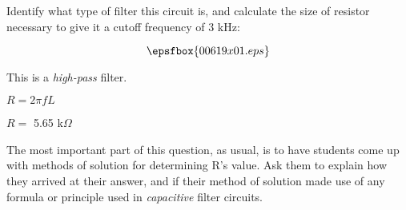 

Identify what type of filter this circuit is, and calculate the size of resistor necessary to give it a cutoff frequency of 3 kHz:

$$\epsfbox{00619x01.eps}$$







This is a {\it high-pass} filter.

\vskip 10pt

$R = 2 \pi f L$

\vskip 10pt

$R =$ 5.65 k$\Omega$







The most important part of this question, as usual, is to have students come up with methods of solution for determining R's value.  Ask them to explain how they arrived at their answer, and if their method of solution made use of any formula or principle used in {\it capacitive} filter circuits.




